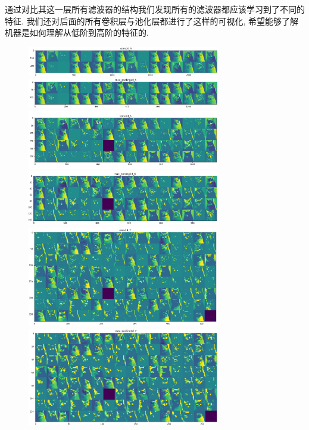 \documentclass[lang=cn,11pt]{elegantpaper}
\begin{document}
通过对比其这一层所有滤波器的结构我们发现所有的滤波器都应该学习到了不同的特征. 我们还对后面的所有卷积层与池化层都进行了这样的可视化, 希望能够了解机器是如何理解从低阶到高阶的特征的.

\begin{figure}[hbtp]
\centering
  \includegraphics[width=0.75\textwidth]{conv2d_5.png}\\
  \includegraphics[width=0.75\textwidth]{max_pooling2d_5}\\
  \includegraphics[width=0.75\textwidth]{conv2d_6}\\
  \includegraphics[width=0.75\textwidth]{max_pooling2d_6}\\
  \includegraphics[width=0.75\textwidth]{conv2d_7}\\
  \includegraphics[width=0.75\textwidth]{max_pooling2d_7}\\

\end{figure}
\end{document}
